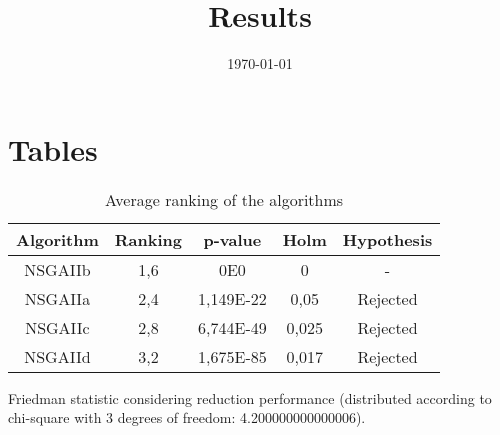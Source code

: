 \documentclass{article}
\title{Results}
\author{}
\date{\today}
\begin{document}
\oddsidemargin 0in \topmargin 0in\maketitle

\section{Tables}
\begin{table}[!htp]
\centering
\begin{tabular}{c|c|c|c|c}
Algorithm&Ranking&p-value&Holm&Hypothesis\\
\hline
NSGAIIb & 1,6 & 0E0 & 0 & -\\
NSGAIIa & 2,4 & 1,149E-22 & 0,05 & Rejected\\
NSGAIIc & 2,8 & 6,744E-49 & 0,025 & Rejected\\
NSGAIId & 3,2 & 1,675E-85 & 0,017 & Rejected\\
\end{tabular}
\caption{Average ranking of the algorithms}
\end{table}


Friedman statistic considering reduction performance (distributed according to chi-square with 3 degrees of freedom: 4.200000000000006).
\end{document}

